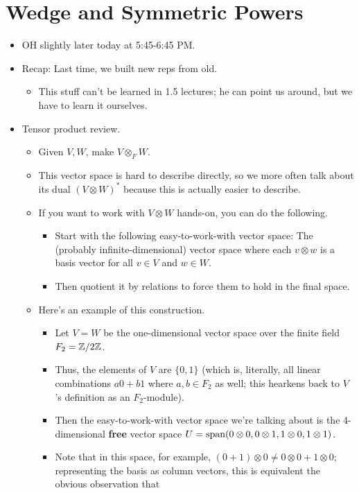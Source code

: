 \documentclass[../notes.tex]{subfiles}
\begin{document}
\section{Wedge and Symmetric Powers}
\begin{itemize}
    \item {}OH slightly later today at 5:45-6:45 PM.
    \item Recap: Last time, we built new reps from old.
    \begin{itemize}
        \item This stuff can't be learned in 1.5 lectures; he can point us around, but we have to learn it ourselves.
    \end{itemize}
    \item Tensor product review.
    \begin{itemize}
        \item Given $V,W$, make $V\otimes_FW$.
        \item This vector space is hard to describe directly, so we more often talk about its dual $(V\otimes W)^*$ because this is actually easier to describe.
        \item If you want to work with $V\otimes W$ hands-on, you can do the following.
        \begin{itemize}
            \item Start with the following easy-to-work-with vector space: The (probably infinite-dimensional) vector space where each $v\otimes w$ is a basis vector for all $v\in V$ and $w\in W$.
            \item Then quotient it by relations to force them to hold in the final space.
        \end{itemize}
        \item Here's an example of this construction.
        \begin{itemize}
            \item Let $V=W$ be the one-dimensional vector space over the finite field $F_2=\mathbb{Z}/2\mathbb{Z}$.
            \item Thus, the elements of $V$ are $\{0,1\}$ (which is, literally, all linear combinations $a0+b1$ where $a,b\in F_2$ as well; this hearkens back to $V$'s definition as an $F_2$-module).
            \item Then the easy-to-work-with vector space we're talking about is the 4-dimensional \textbf{free} vector space $U=\operatorname{span}(0\otimes 0,0\otimes 1,1\otimes 0,1\otimes 1)$.
            \item Note that in this space, for example, $(0+1)\otimes 0\neq 0\otimes 0+1\otimes 0$; representing the basis as column vectors, this is equivalent the obvious observation that

\end{itemize}
\end{itemize}
\end{itemize}
\end{document}
